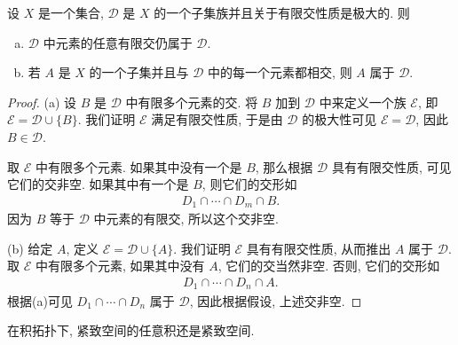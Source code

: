 \documentclass[../../main.tex]{subfiles}
\begin{document}
\begin{lemma}\label{lemma:ch05-maximal-family-properties}
设 $X$ 是一个集合, $\mathcal{D}$ 是 $X$ 的一个子集族并且关于有限交性质是极大的. 则
\begin{enumerate}[(a)]
\item $\mathcal{D}$ 中元素的任意有限交仍属于 $\mathcal{D}$.
\item 若 $A$ 是 $X$ 的一个子集并且与 $\mathcal{D}$ 中的每一个元素都相交, 则 $A$ 属于 $\mathcal{D}$.
\end{enumerate}
\end{lemma}

\begin{proof}
(a) 设 $B$ 是 $\mathcal{D}$ 中有限多个元素的交. 将 $B$ 加到 $\mathcal{D}$ 中来定义一个族 $\mathcal{E}$, 即 $\mathcal{E}=\mathcal{D}\cup\{B\}$. 我们证明 $\mathcal{E}$ 满足有限交性质, 于是由 $\mathcal{D}$ 的极大性可见 $\mathcal{E}=\mathcal{D}$, 因此 $B\in\mathcal{D}$.

取 $\mathcal{E}$ 中有限多个元素. 如果其中没有一个是 $B$, 那么根据 $\mathcal{D}$ 具有有限交性质, 可见它们的交非空. 如果其中有一个是 $B$, 则它们的交形如
\begin{align*}
D_1\cap\cdots\cap D_m\cap B.
\end{align*}
因为 $B$ 等于 $\mathcal{D}$ 中元素的有限交, 所以这个交非空.

(b) 给定 $A$, 定义 $\mathcal{E}=\mathcal{D}\cup\{A\}$. 我们证明 $\mathcal{E}$ 具有有限交性质, 从而推出 $A$ 属于 $\mathcal{D}$. 取 $\mathcal{E}$ 中有限多个元素, 如果其中没有 $A$, 它们的交当然非空. 否则, 它们的交形如
\begin{align*}
D_1\cap\cdots\cap D_n\cap A.
\end{align*}
根据(a)可见 $D_1\cap\cdots\cap D_n$ 属于 $\mathcal{D}$, 因此根据假设, 上述交非空.
\end{proof}

\begin{theorem}[Tychonoff 定理]\label{theorem:ch05-tychonoff}
在积拓扑下, 紧致空间的任意积还是紧致空间.
\end{theorem}
\end{document}
